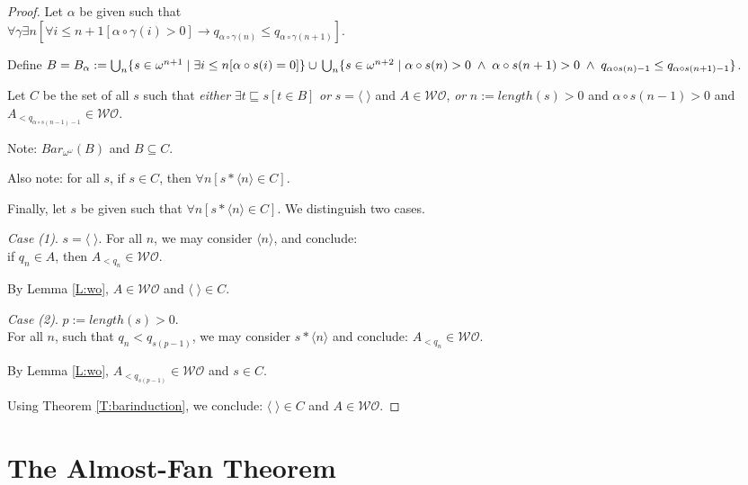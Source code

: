 \documentclass[a4paper]{amsart}
\theoremstyle{plain}
\begin{document}
 \begin{proof} Let $\alpha$ be given such that  \\$\forall \gamma\exists n[\forall i\le n+1[\alpha\circ\gamma(i)>0]\rightarrow q_{\alpha\circ\gamma(n)}\le q_{\alpha\circ\gamma(n+1)}]$. 
 
 \smallskip
Define $B=B_\alpha:=\bigcup_n \{s\in \omega^{n+1} \mid \exists i \le n [\alpha\circ s (i)=0]\} \cup \\\bigcup_n\{s\in \omega^{n+2}\mid \alpha\circ s(n)>0\;\wedge\;\alpha\circ s(n+1) >0   \;\wedge\;  q_{\alpha\circ s(n)-1}\le q_{\alpha\circ s(n+1)-1}\}$. 

\smallskip
Let $C$ be the set of all $s$ such that {\it either} $\exists t\sqsubseteq s[t \in B]$ {\it or}  $s=\langle \;\rangle$ and $A\in \mathcal{WO}$, {\it or} $n:=length(s)>0$ and   $\alpha\circ s(n-1)>0$ and  $A_{<q_{\alpha\circ s(n-1)-1}}\in \mathcal{WO}$.  

\smallskip Note: $Bar_{\omega^\omega}(B)$ and $B\subseteq C$.

Also note: for all $s$, if $s\in C$, then $\forall n[s\ast\langle n \rangle \in C]$.

Finally, let $s$ be given such that $\forall n[s\ast\langle n \rangle \in C]$. We distinguish two cases.

{\it Case (1)}. $s=\langle \;\rangle$. For all $n$, we may consider $\langle n \rangle$, and conclude: \\ if $q_n \in A$, then $A_{<q_n} \in \mathcal{WO}$.

By Lemma \ref{L:wo}, $A\in \mathcal{WO}$ and $\langle\;\rangle \in C$.

{\it Case (2)}. $p:=length(s) >0$. \\For all $n$, such that $q_n<q_{s(p-1)}$, we may consider $s\ast\langle n \rangle$ and conclude:  $A_{<q_n} \in \mathcal{WO}$.

By Lemma \ref{L:wo}, $A_{<q_{s(p-1)}}\in \mathcal{WO}$ and $s \in C$.

\smallskip Using Theorem \ref{T:barinduction}, we conclude:  $\langle\;\rangle \in C$ and $A\in \mathcal{WO}$.

\end{proof} 

\section{The Almost-Fan Theorem}\label{S:aft}
\end{document}
